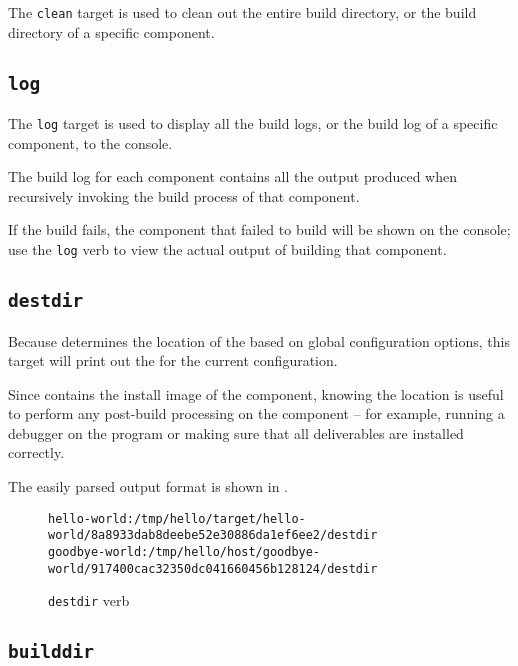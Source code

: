 The \texttt{clean} target is used to clean out the entire build
directory, or the build directory of a specific component.

\subsection{\texttt{log}}

The \texttt{log} target is used to display all the build logs, or the
build log of a specific component, to the console.

The build log for each component contains all the output produced when
recursively invoking the build process of that component.

If the build fails, the component that failed to build will be shown
on the console; use the \texttt{log} verb to view the actual output of
building that component.

\subsection{\texttt{destdir}}\label{usinglmsbw:destdir}

Because \lmsbw determines the location of the \destdir based on global
configuration options, this target will print out the \destdir for the
current configuration.

Since \destdir contains the install image of the component, knowing
the \destdir location is useful to perform any post-build processing
on the component -- for example, running a debugger on the program or
making sure that all deliverables are installed correctly.

The easily parsed output format is shown in
.

\begin{figure}[tbh]
\hrulefill
\begin{scriptsize}
\begin{verbatim}
hello-world:/tmp/hello/target/hello-world/8a8933dab8deebe52e30886da1ef6ee2/destdir
goodbye-world:/tmp/hello/host/goodbye-world/917400cac32350dc041660456b128124/destdir
\end{verbatim}
\end{scriptsize}
\hrulefill
\caption{\texttt{destdir} verb}\label{usinglmsbw:destdir-verb}
\end{figure}

\subsection{\texttt{builddir}}\label{usinglmsbw:builddir}

